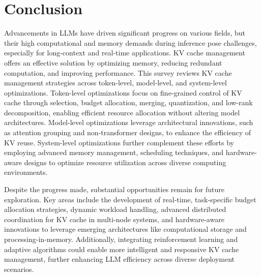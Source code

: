 \section{Conclusion}
\label{sec:conclusion}
Advancements in LLMs have driven significant progress on various fields, but their high computational and memory demands during inference pose challenges, especially for long-context and real-time applications. KV cache management offers an effective solution by optimizing memory, reducing redundant computation, and improving performance.
This survey reviews KV cache management strategies across token-level, model-level, and system-level optimizations.
Token-level optimizations focus on fine-grained control of KV cache through selection, budget allocation, merging, quantization, and low-rank decomposition, enabling efficient resource allocation without altering model architectures. Model-level optimizations leverage architectural innovations, such as attention grouping and non-transformer designs, to enhance the efficiency of KV reuse. System-level optimizations further complement these efforts by employing advanced memory management, scheduling techniques, and hardware-aware designs to optimize resource utilization across diverse computing environments.



Despite the progress made, substantial opportunities remain for future exploration. Key areas include the development of real-time, task-specific budget allocation strategies, dynamic workload handling, advanced distributed coordination for KV cache in multi-node systems, and hardware-aware innovations to leverage emerging architectures like computational storage and processing-in-memory. Additionally, integrating reinforcement learning and adaptive algorithms could enable more intelligent and responsive KV cache management, further enhancing LLM efficiency across diverse deployment scenarios.

 